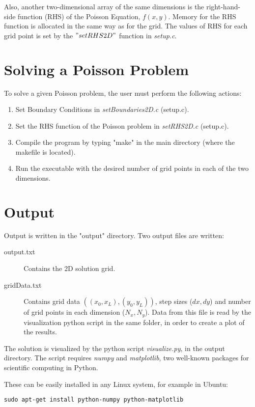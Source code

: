\documentclass[11pt]{report}
\begin{document}
Also, another two-dimensional array of the same dimensions is the right-hand-side function (RHS) of the Poisson Equation, $f(x,y)$. Memory for the RHS function is allocated in the same way as for the grid. The values of RHS for each grid point is set by the $"setRHS2D"$ function in \emph{setup.c}.

\section{Solving a Poisson Problem}
To solve a given Poisson problem, the user must perform the following actions:

\begin{enumerate}
  \item Set Boundary Conditions in \emph{setBoundaries2D.c} (setup.c).
  \item Set the RHS function of the Poisson problem in \emph{setRHS2D.c} (setup.c).
  \item Compile the program by typing "make" in the main directory (where the makefile is located).
  \item Run the executable with the desired number of grid points in each of the two dimensions.
\end{enumerate}

\section{Output}
Output is written in the "output" directory. Two output files are written:

\begin{description}
  \item[output.txt] Contains the 2D solution grid.
  \item[gridData.txt] Contains grid data $\left( (x_0, x_L), (y_0, y_L) \right) $, step sizes ($dx, dy$) and number of grid points in each dimension ($N_x, N_y$). Data from this file is read by the visualization python script in the same folder, in order to create a plot of the results.
\end{description}

The solution is visualized by the python script \emph{visualize.py}, in the output directory.
The script requires \emph{numpy} and \emph{matplotlib}, two well-known packages for scientific computing in Python.

These can be easily installed in any Linux system, for example in Ubuntu:

\begin{lstlisting}
sudo apt-get install python-numpy python-matplotlib
\end{lstlisting}
\end{document}
